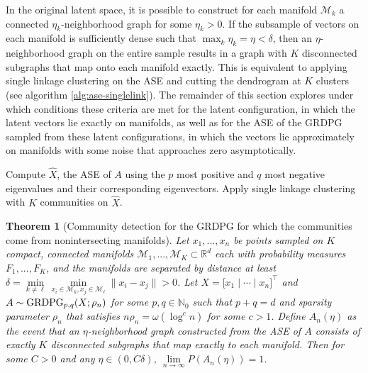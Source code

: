 \documentclass[
  12pt,
]{article}
\newtheorem{theorem}{Theorem}[section]
\theoremstyle{definition}
\theoremstyle{definition}
\theoremstyle{definition}
\theoremstyle{definition}
\theoremstyle{remark}
\begin{document}
In the original latent space, it is possible to construct for each manifold \(\mathcal{M}_k\) a connected \(\eta_k\)-neighborhood graph for some \(\eta_k > 0\).
If the subsample of vectors on each manifold is sufficiently dense such that \(\max_k \eta_k = \eta < \delta\), then an \(\eta\)-neighborhood graph on the entire sample results in a graph with \(K\) disconnected subgraphs that map onto each manifold exactly.
This is equivalent to applying single linkage clustering on the ASE and cutting the dendrogram at \(K\) clusters (see algorithm \ref{alg:ase-singlelink}).
The remainder of this section explores under which conditions these criteria are met for the latent configuration, in which the latent vectors lie exactly on manifolds, as well as for the ASE of the GRDPG sampled from these latent configurations, in which the vectors lie approximately on manifolds with some noise that approaches zero asymptotically.

\begin{algorithm}[h]
\label{alg:ase-singlelink}
\DontPrintSemicolon
\SetAlgoLined
{}
Compute $\hat{X}$, the ASE of $A$ using the $p$ most positive and $q$ most negative eigenvalues and their corresponding eigenvectors.\;
Apply single linkage clustering with $K$ communities on $\hat{X}$.\;
\caption{ASE clustering for nonintersecting communities.}
\end{algorithm}

\begin{theorem}[Community detection for the GRDPG for which the communities come from nonintersecting manifolds]
\label{theorem:nonintersect-grdpg}
Let $x_1, ..., x_n$ be points sampled on $K$ compact, connected manifolds $\mathcal{M}_1, ..., \mathcal{M}_K \subset \mathbb{R}^d$ each with probability measures $F_1, ..., F_K$, and the manifolds are separated by distance at least $\delta = \min\limits_{k \neq \ell} \min\limits_{x_i \in \mathcal{M}_k, x_j \in \mathcal{M}_\ell} \| x_i - x_j \| > 0$. 
Let $X = \Big[ x_1 \mid \cdots \mid x_n \Big]^\top$ and $A \sim \mathrm{GRDPG}_{p,q}(X; \rho_n)$ for some $p, q \in \mathbb{N}_0$ such that $p + q = d$ and sparsity parameter $\rho_n$ that satisfies $n \rho_n = \omega(\log^c n)$ for some $c > 1$. 
Define $A_n(\eta)$ as the event that an $\eta$-neighborhood graph constructed from the ASE of $A$ consists of exactly $K$ disconnected subgraphs that map exactly to each manifold. 
Then for some $C > 0$ and any $\eta \in (0, C \delta)$, $\lim\limits_{n \to \infty} P(A_n(\eta)) = 1$. 
\end{theorem}
\end{document}
